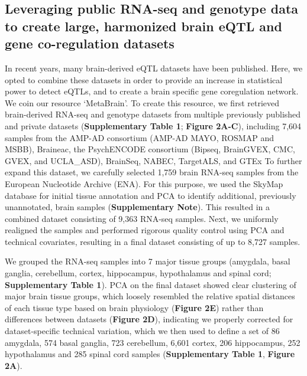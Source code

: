 {{\subsection{Leveraging public RNA-seq and genotype data to create large, harmonized brain eQTL and gene co-regulation datasets}
In recent years, many brain-derived eQTL datasets have been published. Here, we opted to combine these datasets in order to provide an increase in statistical power to detect eQTLs, and to create a brain specific gene coregulation network. We coin our resource ‘MetaBrain'. To create this resource, we first retrieved brain-derived RNA-seq and genotype datasets from multiple previously published and private datasets (\textbf{Supplementary Table 1}; \textbf{Figure 2A-C}), including 7,604 samples from the AMP-AD consortium\cite{hodesAcceleratingMedicinesPartnership2016} (AMP-AD MAYO\cite{hodesAcceleratingMedicinesPartnership2016}, ROSMAP\cite{hodesAcceleratingMedicinesPartnership2016} and MSBB\cite{hodesAcceleratingMedicinesPartnership2016}), Braineac\cite{ramasamyGeneticVariabilityRegulation2014}, the PsychENCODE consortium\cite{consortium*RevealingBrainMolecular2018} (Bipseq\cite{wangComprehensiveFunctionalGenomic2018}, BrainGVEX\cite{wangComprehensiveFunctionalGenomic2018}, CMC\cite{fromerGeneExpressionElucidates2016}, GVEX, and UCLA\_ASD\cite{wangComprehensiveFunctionalGenomic2018}), BrainSeq\cite{brainseq2015}, NABEC\cite{gibbsAbundantQuantitativeTrait2010}, TargetALS\cite{prudencioDistinctBrainTranscriptome2015}, and GTEx\cite{donovanCellularDeconvolutionGTEx2020} To further expand this dataset, we carefully selected 1,759 brain RNA-seq samples from the European Nucleotide Archive (ENA)\cite{leinonenEuropeanNucleotideArchive2011}. For this purpose, we used the SkyMap\cite{tsuiExtractingAllelicRead2018} database for initial tissue annotation and PCA to identify additional, previously unannotated, brain samples (\textbf{Supplementary Note}). This resulted in a combined dataset consisting of 9,363 RNA-seq samples. Next, we uniformly realigned the samples and performed rigorous quality control using PCA and technical covariates, resulting in a final dataset consisting of up to 8,727 samples.  

We grouped the RNA-seq samples into 7 major tissue groups (amygdala, basal ganglia, cerebellum, cortex, hippocampus, hypothalamus and spinal cord; \textbf{Supplementary Table 1}). PCA on the final dataset showed clear clustering of major brain tissue groups, which loosely resembled the relative spatial distances of each tissue type based on brain physiology (\textbf{Figure 2E}) rather than differences between datasets (\textbf{Figure 2D}), indicating we properly corrected for dataset-specific technical variation, which we then used to define a set of 86 amygdala, 574 basal ganglia, 723 cerebellum, 6,601 cortex, 206 hippocampus, 252 hypothalamus and 285 spinal cord samples (\textbf{Supplementary Table 1}, \textbf{Figure 2A}). 

}}
